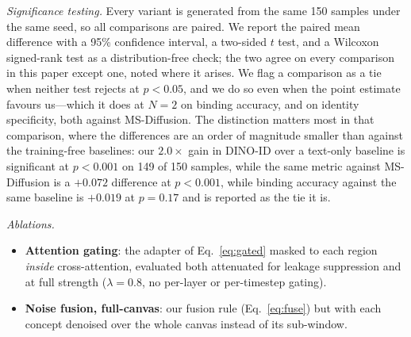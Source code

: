 \documentclass[review,10pt,times]{elsarticle}
\begin{document}
\noindent\textit{Significance testing.}
\label{sec:significance}
Every variant is generated from the same 150 samples under the same seed, so
all comparisons are paired.  We report the paired mean difference with a
95\% confidence interval, a two-sided $t$ test, and a Wilcoxon signed-rank
test as a distribution-free check; the two agree on every comparison in this
paper except one, noted where it arises.  We flag a comparison as a tie when
neither test rejects at $p{<}0.05$, and we do so even when the point estimate
favours us---which it does at $N{=}2$ on binding accuracy, and on identity
specificity, both against MS-Diffusion.  The distinction matters most in that
comparison, where the differences are an order of magnitude smaller than
against the training-free baselines: our $2.0\times$ gain in DINO-ID over a
text-only baseline is significant at $p{<}0.001$ on 149 of 150 samples, while
the same metric against MS-Diffusion is a $+0.072$ difference at
$p{<}0.001$, while binding accuracy against the same baseline is $+0.019$ at
$p{=}0.17$ and is reported as the tie it is.

\noindent\textit{Ablations.}
\begin{itemize}\setlength\itemsep{2pt}
\item \textbf{Attention gating}: the adapter of Eq.~\ref{eq:gated} masked to
      each region \emph{inside} cross-attention, evaluated both attenuated for
      leakage suppression and at full strength ($\lambda{=}0.8$, no per-layer
      or per-timestep gating).
\item \textbf{Noise fusion, full-canvas}: our fusion rule
      (Eq.~\ref{eq:fuse}) but with each concept denoised over the whole
      canvas instead of its sub-window.
\end{itemize}
\end{document}
